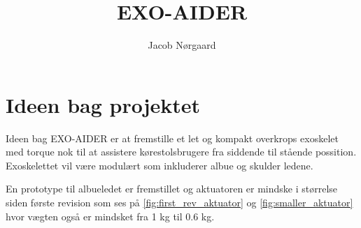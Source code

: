 

\title{\textbf{EXO-AIDER}}
\author{Jacob Nørgaard}
 


\begin{titlepage}
\clearpage\maketitle
\thispagestyle{empty}
\end{titlepage}

\section{Ideen bag projektet}
Ideen bag EXO-AIDER er at fremstille et let og kompakt overkrops exoskelet med torque nok til at assistere kørestolsbrugere fra siddende til stående possition. Exoskelettet vil være modulært som inkluderer albue og skulder ledene. 

En prototype til albueledet er fremstillet og aktuatoren er mindske i størrelse siden første revision som ses på \autoref{fig:first_rev_aktuator} og \autoref{fig:smaller_aktuator} hvor vægten også er mindsket fra 1 kg til 0.6 kg.


